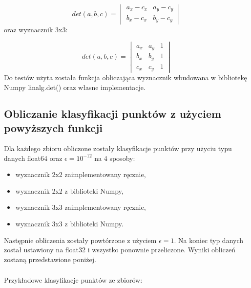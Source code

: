 \documentclass[11pt]{scrartcl}
\begin{document}
    \[det(a,b,c)=
    \begin{vmatrix}
        a_x - c_x & a_y - c_y \\
        b_x - c_x & b_y - c_y
    \end{vmatrix}\]
    oraz wyznacznik 3x3:

    \[det(a,b,c)=
    \begin{vmatrix}
        a_x & a_y & 1 \\
        b_x & b_y & 1 \\
        c_x & c_y & 1
    \end{vmatrix}\]
    Do testów użyta została funkcja obliczająca wyznacznik wbudowana w bibliotekę
    Numpy linalg.det() oraz własne implementacje.

    \subsection{Obliczanie klasyfikacji punktów z użyciem powyższych funkcji}
    Dla każdego zbioru obliczone zostały klasyfikacje punktów przy użyciu
    typu danych float64 oraz $\epsilon=10^{-12}$ na 4 sposoby:

    \begin{itemize}
        \item wyznacznik 2x2 zaimplementowany ręcznie,
        \item wyznacznik 2x2 z biblioteki Numpy,
        \item wyznacznik 3x3 zaimplementowany ręcznie,
        \item wyznacznik 3x3 z biblioteki Numpy.
    \end{itemize}
    Następnie obliczenia zostały powtórzone z użyciem $\epsilon=1$. Na koniec
    typ danych został ustawiony na float32 i wszystko ponownie przeliczone.
    Wyniki obliczeń zostaną przedstawione poniżej.
    \subsubsection*{}
    Przykładowe klasyfikacje punktów ze zbiorów:
\end{document}
